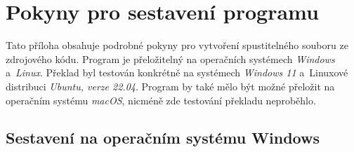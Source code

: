 
%






\chapter{Pokyny pro sestavení programu}

Tato příloha obsahuje podrobné pokyny pro vytvoření spustitelného souboru ze zdrojového kódu. Program je přeložitelný na operačních systémech \emph{Windows} a~\emph{Linux}. Překlad byl testován konkrétně na systémech \emph{Windows 11} a~Linuxové distribuci \emph{Ubuntu, verze 22.04}. Program by také mělo být možné přeložit na operačním systému \emph{macOS}, nicméně zde testování překladu neproběhlo.

\section*{Sestavení na operačním systému Windows}

